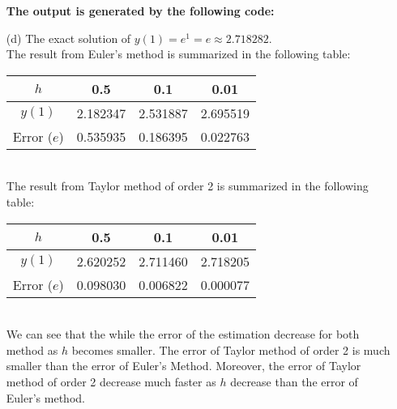 \documentclass[11pt]{article}
\begin{document}
\begin{itemize}
	 \textbf{The output is generated by the following code:}
	 
	 
	 \item [(d)]
	 The exact solution of $ y(1) = e^1 = e \approx 2.718282 $.\\
	 The result from Euler's method is summarized in the following table:
	 \begin{table}[h]
	 	\centering
	 	\begin{tabular}{c|ccc}
	 		$ h $ & 0.5 & 0.1 & 0.01    \\ \hline
	 		$ y(1) $ & 2.182347 & 2.531887 & 2.695519 \\ \hline
	 		Error ($ e $) & 0.535935 & 0.186395 & 0.022763
	 	\end{tabular}
	 \end{table}\\
 	The result from Taylor method of order 2 is summarized in the following table:
 	\begin{table}[h]
 		\centering
 		\begin{tabular}{c|ccc}
 			$ h $ & 0.5 & 0.1 & 0.01    \\ \hline
 			$ y(1) $ & 2.620252 & 2.711460 & 2.718205 \\ \hline
 			Error ($ e $) & 0.098030 & 0.006822 & 0.000077
 		\end{tabular}
 	\end{table}\\
	 We can see that the while the error of the estimation decrease for both method as $ h $ becomes smaller. The error of Taylor method of order 2 is much smaller than the error of Euler's Method. Moreover, the error of Taylor method of order 2 decrease much faster as $ h $ decrease than the error of Euler's method.
\end{itemize}
\end{document}
